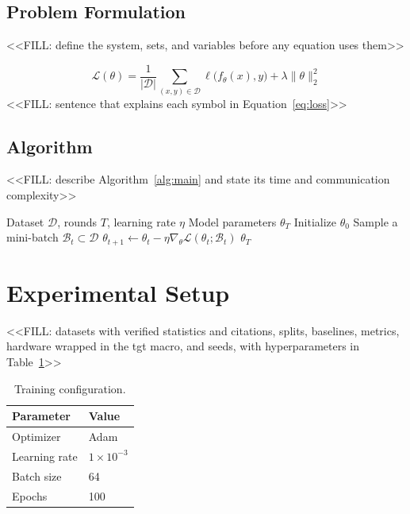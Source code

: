\documentclass[conference]{IEEEtran}
\begin{document}
\subsection{Problem Formulation}
<<FILL: define the system, sets, and variables before any equation uses them>>

\begin{equation}
\mathcal{L}(\theta) = \frac{1}{|\mathcal{D}|}\sum_{(x,y)\in\mathcal{D}} \ell\big(f_\theta(x), y\big) + \lambda \lVert \theta \rVert_2^2
\label{eq:loss}
\end{equation}
<<FILL: sentence that explains each symbol in Equation~\eqref{eq:loss}>>

\subsection{Algorithm}
<<FILL: describe Algorithm~\ref{alg:main} and state its time and communication complexity>>

\begin{algorithm}[t]
\caption{Training procedure}
\label{alg:main}
\begin{algorithmic}[1]
\Require Dataset $\mathcal{D}$, rounds $T$, learning rate $\eta$
\Ensure Model parameters $\theta_T$
\State Initialize $\theta_0$
\State Sample a mini-batch $\mathcal{B}_t \subset \mathcal{D}$
\State $\theta_{t+1} \gets \theta_t - \eta \nabla_\theta \mathcal{L}(\theta_t; \mathcal{B}_t)$
\EndFor
\State \Return $\theta_T$
\end{algorithmic}
\end{algorithm}

\section{Experimental Setup}\label{sec:setup}
<<FILL: datasets with verified statistics and citations, splits, baselines, metrics, hardware wrapped in the tgt macro, and seeds, with hyperparameters in Table~\ref{tab:hyper}>>

\begin{table}[t]
\centering
\caption{Training configuration.}
\label{tab:hyper}
\begin{tabular}{@{}ll@{}}
\toprule
Parameter & Value \\
\midrule
Optimizer & Adam~\cite{kingma2014adam} \\
Learning rate & $1\times10^{-3}$ \\
Batch size & 64 \\
Epochs & 100 \\
\bottomrule
\end{tabular}
\end{table}
\end{document}
